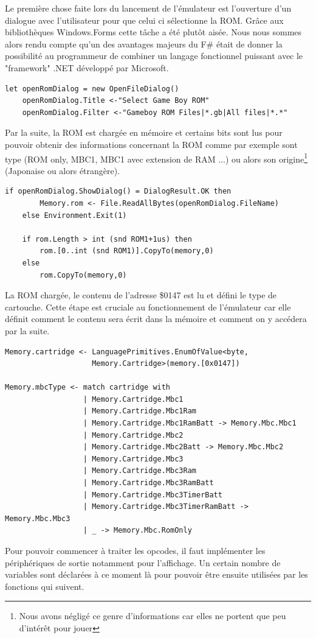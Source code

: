 \documentclass[12pt, a4paper]{article}
\begin{document}
Le première chose faite lors du lancement de l'émulateur est l'ouverture d'un dialogue avec l'utilisateur pour que celui ci sélectionne la ROM. Grâce aux bibliothèques Windows.Forms cette tâche a été plutôt aisée. Nous nous sommes alors rendu compte qu'un des avantages majeurs du F\# était de donner la possibilité au programmeur de combiner un langage fonctionnel puissant avec le "framework" .NET développé par Microsoft.
\bigskip
\small{\begin{lstlisting}[frame=single]
let openRomDialog = new OpenFileDialog()
    openRomDialog.Title <-"Select Game Boy ROM" 
    openRomDialog.Filter <-"Gameboy ROM Files|*.gb|All files|*.*"
\end{lstlisting}}
\bigskip
\large
Par la suite, la ROM est chargée en mémoire et certains bits sont lus pour pouvoir obtenir des informations concernant la ROM comme par exemple sont type (ROM only, MBC1, MBC1 avec extension de RAM ...) ou alors son origine\footnote{Nous avons négligé ce genre d'informations car elles ne portent que peu d'intérêt pour jouer} (Japonaise ou alors étrangère).
\bigskip
\pagebreak
\small{\begin{lstlisting}[frame=single]
if openRomDialog.ShowDialog() = DialogResult.OK then
        Memory.rom <- File.ReadAllBytes(openRomDialog.FileName)
    else Environment.Exit(1)

    if rom.Length > int (snd ROM1+1us) then
        rom.[0..int (snd ROM1)].CopyTo(memory,0)
    else
        rom.CopyTo(memory,0)
\end{lstlisting}}
\bigskip
\large
La ROM chargée, le contenu de l'adresse \$0147 est lu et défini le type de cartouche. Cette étape est cruciale au fonctionnement de l'émulateur car elle définit comment le contenu sera écrit dans la mémoire et comment on y accédera par la suite.
\bigskip
\tiny{\begin{lstlisting}[frame=single]
Memory.cartridge <- LanguagePrimitives.EnumOfValue<byte, 
                    Memory.Cartridge>(memory.[0x0147])
    
Memory.mbcType <- match cartridge with
                  | Memory.Cartridge.Mbc1 
                  | Memory.Cartridge.Mbc1Ram 
                  | Memory.Cartridge.Mbc1RamBatt -> Memory.Mbc.Mbc1
                  | Memory.Cartridge.Mbc2 
                  | Memory.Cartridge.Mbc2Batt -> Memory.Mbc.Mbc2
                  | Memory.Cartridge.Mbc3 
                  | Memory.Cartridge.Mbc3Ram 
                  | Memory.Cartridge.Mbc3RamBatt 
                  | Memory.Cartridge.Mbc3TimerBatt 
                  | Memory.Cartridge.Mbc3TimerRamBatt -> Memory.Mbc.Mbc3
                  | _ -> Memory.Mbc.RomOnly
\end{lstlisting}}
\large
\bigskip
Pour pouvoir commencer à traiter les opcodes, il faut implémenter les périphériques de sortie notamment pour l'affichage. Un certain nombre de variables sont déclarées à ce moment là pour pouvoir être ensuite utilisées par les fonctions qui suivent.  
\end{document}
